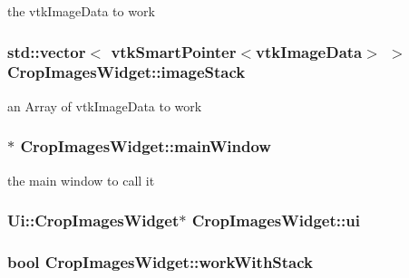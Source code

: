 the vtk\-Image\-Data to work 

\hypertarget{class_crop_images_widget_a924d245cce06a0c16d6c4bd8a3762a67}{
\subsubsection[{image\-Stack}]{\setlength{\rightskip}{0pt plus 5cm}std\-::vector$<$ vtk\-Smart\-Pointer$<$vtk\-Image\-Data$>$ $>$ {\bf Crop\-Images\-Widget\-::image\-Stack}}}\label{d0/d3c/class_crop_images_widget_a924d245cce06a0c16d6c4bd8a3762a67}


an Array of vtk\-Image\-Data to work 

\hypertarget{class_crop_images_widget_a1fa1df3ba49de9524eac0a15875f57d5}{
\subsubsection[{main\-Window}]{$\ast$ {\bf Crop\-Images\-Widget\-::main\-Window}}}\label{d0/d3c/class_crop_images_widget_a1fa1df3ba49de9524eac0a15875f57d5}
the main window to call it \hypertarget{class_crop_images_widget_adc7928104c839cc22de3d73b286b1fad}{
\subsubsection[{ui}]{\setlength{\rightskip}{0pt plus 5cm}Ui\-::\-Crop\-Images\-Widget$\ast$ {\bf Crop\-Images\-Widget\-::ui}}}\label{d0/d3c/class_crop_images_widget_adc7928104c839cc22de3d73b286b1fad}
\hypertarget{class_crop_images_widget_afaead54d7c3cf3549137e3177db95385}{
\subsubsection[{work\-With\-Stack}]{\setlength{\rightskip}{0pt plus 5cm}bool {\bf Crop\-Images\-Widget\-::work\-With\-Stack}}}\label{d0/d3c/class_crop_images_widget_afaead54d7c3cf3549137e3177db95385}



